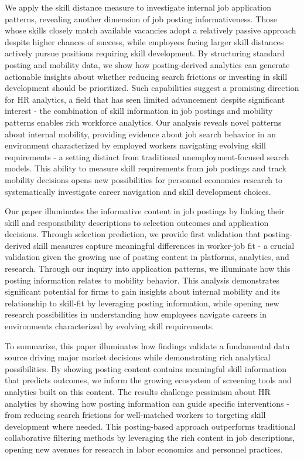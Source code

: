 \documentclass[12pt]{article}
\begin{document}
We apply the skill distance measure to investigate internal job application patterns, revealing another dimension of job posting informativeness. Those whose skills closely match available vacancies adopt a relatively passive approach despite higher chances of success, while employees facing larger skill distances actively pursue positions requiring skill development. By structuring standard posting and mobility data, we show how posting-derived analytics can generate actionable insights about whether reducing search frictions or investing in skill development should be prioritized. Such capabilities suggest a promising direction for HR analytics, a field that has seen limited advancement despite significant interest \parencite{Tambe2019} - the combination of skill information in job postings and mobility patterns enables rich workforce analytics. Our analysis reveals novel patterns about internal mobility, providing evidence about job search behavior in an environment characterized by employed workers navigating evolving skill requirements - a setting distinct from traditional unemployment-focused search models. This ability to measure skill requirements from job postings and track mobility decisions opens new possibilities for personnel economics research to systematically investigate career navigation and skill development choices.


Our paper illuminates the informative content in job postings by linking their skill and responsibility descriptions to selection outcomes and application decisions. Through selection prediction, we provide first validation that posting-derived skill measures capture meaningful differences in worker-job fit - a crucial validation given the growing use of posting content in platforms, analytics, and research. Through our inquiry into application patterns, we illuminate how this posting information relates to mobility behavior. This analysis demonstrates significant potential for firms to gain insights about internal mobility and its relationship to skill-fit by leveraging posting information, while opening new research possibilities in understanding how employees navigate careers in environments characterized by evolving skill requirements.


To summarize, this paper illuminates how  findings validate a fundamental data source driving major market decisions while demonstrating rich analytical possibilities. By showing posting content contains meaningful skill information that predicts outcomes, we inform the growing ecosystem of screening tools and analytics built on this content. The results challenge pessimism about HR analytics by showing how posting information can guide specific interventions - from reducing search frictions for well-matched workers to targeting skill development where needed. This posting-based approach outperforms traditional collaborative filtering methods by leveraging the rich content in job descriptions, opening new avenues for research in labor economics and personnel practices.
\end{document}
